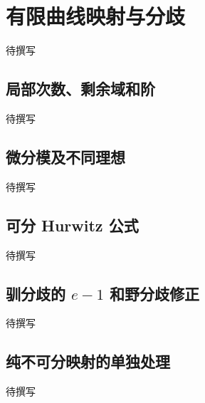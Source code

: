 
% 
% 

\section{有限曲线映射与分歧}
\label{g5:sec:2401}

待撰写

\subsection{局部次数、剩余域和阶}
\label{g5:subsec:2401:01}
待撰写

\subsection{微分模及不同理想}
\label{g5:subsec:2401:02}
待撰写

\subsection{可分 Hurwitz 公式}
\label{g5:subsec:2401:03}
待撰写

\subsection{\texorpdfstring{驯分歧的 \(e-1\) 和野分歧修正}{驯分歧的 e−1 和野分歧修正}}
\label{g5:subsec:2401:04}
待撰写

\subsection{纯不可分映射的单独处理}
\label{g5:subsec:2401:05}
待撰写
